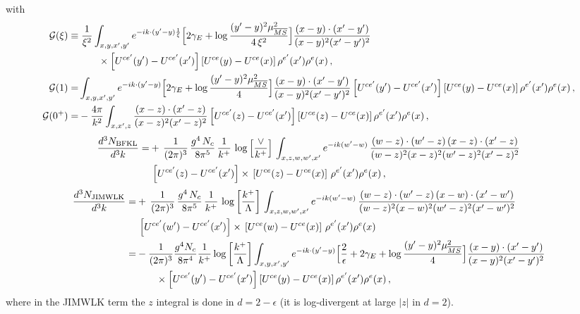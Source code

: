 \documentclass[10pt]{article}
\begin{document}
with
\begin{align}
\mathcal G(\xi)\equiv&\;\frac{1}{\xi^{2}}\int_{x,y,x',y'}e^{-ik\cdot(y'-y)\frac{1}{\xi}}\Big[2\gamma_{E}+\log\frac{(y'-y)^{2}\mu^{2}_{\overline{MS}}}{4\,\xi^{2}}\Big]\frac{(x-y)\cdot(x'-y')}{(x-y)^{2}(x'-y')^{2}}\notag\\
&\qquad\times\left[U^{ce'}(y')-U^{ce'}(x')\right]\left[U^{ce}(y)-U^{ce}(x)\right]\rho^{e'}(x')\rho^{e}(x)\,,\\
\mathcal G(1)=&\int_{x,y,x',y'}e^{-ik\cdot(y'-y)}\Big[2\gamma_{E}+\log\frac{(y'-y)^{2}\mu^{2}_{\overline{MS}}}{4}\Big]\frac{(x-y)\cdot(x'-y')}{(x-y)^{2}(x'-y')^{2}}\left[U^{ce'}(y')-U^{ce'}(x')\right]\left[U^{ce}(y)-U^{ce}(x)\right]\rho^{e'}(x')\rho^{e}(x)\,,\\
\mathcal G(0^+)=&-\frac{4\pi}{k^{2}}\int_{x,x',z}\frac{(x-z)\cdot(x'-z)}{(x-z)^{2}(x'-z)^{2}}\left[U^{ce'}(z)-U^{ce'}(x')\right]\left[U^{ce}(z)-U^{ce}(x)\right]\rho^{e'}(x')\rho^{e}(x)\,,
\end{align}
\begin{align}
 \frac{d^{3}N_{\rm BFKL}}{d^{3}k} = &   +\,\frac{1}{(2\pi)^{3}}\,\frac{g^{4}\,N_{c}}{8\pi^{5}}\,\frac{1}{k^{+}}\,\log{\left[\frac{\vee}{k^{+}}\right]}\,\int_{x,z,w,w',x'}e^{-ik(w'-w)}\,\frac{(w-z)\cdot (w'-z)\,(x-z)\cdot (x'-z)}{(w-z)^{2}(x-z)^{2}(w'-z)^{2}(x'-z)^{2}}\notag\\ & \, \left[U^{ce'}(z) - U^{ce'}(x')\right] \times\, \left[U^{ce}(z) - U^{ce}(x)\right]\, \rho^{e'}(x') \rho^{e}(x)\,,
\end{align}
\begin{align}
\frac{d^{3}N_{\rm JIMWLK}}{d^{3}k} = &    +\,\frac{1}{(2\pi)^{3}}\,\frac{g^{4}\,N_{c}}{8\pi^{5}}\,\frac{1}{k^{+}}\,\log{\left[\frac{k^{+}}{\Lambda}\right]}\,\int_{x,z,w,w',x'}e^{-ik(w'-w)}\,\frac{(w-z)\cdot (w'-z)\,(x-w)\cdot (x'-w')}{(w-z)^{2}(x-w)^{2}(w'-z)^{2}(x'-w')^{2}}\notag\\ & \, \left[U^{ce'}(w') - U^{ce'}(x')\right] \times\, \left[U^{ce}(w) - U^{ce}(x)\right]\, \rho^{e'}(x') \rho^{e}(x)\notag\\
=&-\frac{1}{(2\pi)^{3}}\frac{g^{4}N_{c}}{8\pi^{4}}\frac{1}{k^{+}}\log{\left[\frac{k^{+}}{\Lambda}\right]}\int_{x,y,x',y'}e^{-ik\cdot(y'-y)}\Big[\frac{2}{\epsilon}+2\gamma_{E}+\log\frac{(y'-y)^{2}\mu^{2}_{\overline{MS}}}{4}\Big]\frac{(x-y)\cdot(x'-y')}{(x-y)^{2}(x'-y')^{2}}\notag\\
&\qquad\times\left[U^{ce'}(y')-U^{ce'}(x')\right]\left[U^{ce}(y)-U^{ce}(x)\right]\rho^{e'}(x')\rho^{e}(x)\,,
\end{align}
where in the JIMWLK term the $z$ integral is done in $d=2-\epsilon$ (it is log-divergent at large $|z|$
in $d=2$).
\end{document}

